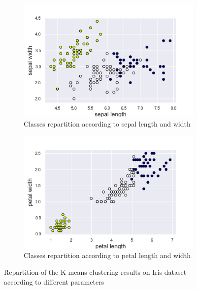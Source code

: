 \documentclass[twocolumn, 10pt]{article}
\begin{document}
			\begin{figure}[h]
				\centering
				\begin{subfigure}[t]{.49\columnwidth}
					\centering
					\includegraphics[width=\linewidth]{../graphics/kmeans_sepal_length_sepal_width_label.png}
					\caption{Classes repartition according to sepal length and width}
					\label{fig:iris_kmeans_sep}
				\end{subfigure}
				\begin{subfigure}[t]{.49\columnwidth}
					\centering
					\includegraphics[width=\linewidth]{../graphics/kmeans_petal_length_petal_width_label.png}
					\caption{Classes repartition according to petal length and width}
					\label{fig:iris_kmeans_pet}
				\end{subfigure}
				\caption{Repartition of the K-means clustering results on Iris dataset according to different parameters}
				\label{fig:iris_kmeans}
			\end{figure}
\end{document}
